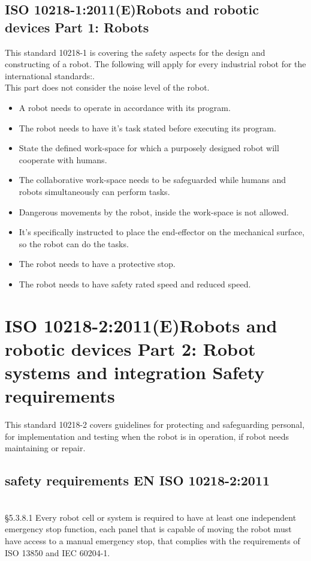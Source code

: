 \subsection{ISO 10218-1:2011(E)Robots and robotic devices Part 1: Robots}
This standard 10218-1 is covering the safety aspects for the design and constructing of a robot.
The following will apply for every industrial robot for the international standards:\cite{Robotterdel1ds}.\\
This part does not consider the noise level of the robot.
\begin{itemize}
    \item A robot needs to operate in accordance with its program.
    \item The robot needs to have it's task stated before executing its program.
    \item State the defined work-space for which a purposely designed robot will cooperate with humans.
    \item The collaborative work-space needs to be safeguarded while humans and robots simultaneously can perform tasks.
    \item Dangerous movements by the robot, inside the work-space is not allowed.
    \item It's specifically instructed to place the end-effector on the mechanical surface, so the robot can do the tasks.
    \item The robot needs to have a protective stop.
    \item The robot needs to have safety rated speed and reduced speed.
\end{itemize}

\section{ISO 10218-2:2011(E)Robots and robotic devices Part 2: Robot systems and integration Safety requirements}\label{ISO2}
This standard 10218-2 covers guidelines for protecting and safeguarding personal, for implementation and testing when the robot is in operation, if robot needs maintaining or repair.

\subsection{safety requirements EN ISO 10218-2:2011}\\

\S5.3.8.1 Every robot cell or system is required to have at least one independent emergency stop function, each panel that is capable of moving the robot must have access to a manual emergency stop, that complies with the requirements of ISO 13850 and IEC 60204-1.\\ 

